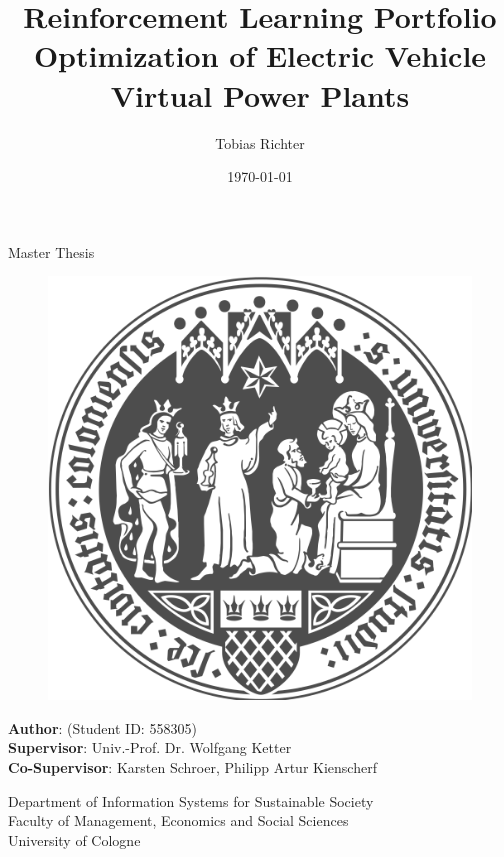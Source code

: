 \documentclass[a4paper, twoside, 12pt]{article}
\author{Tobias Richter}
\date{\today}
\title{Reinforcement Learning Portfolio Optimization of Electric Vehicle Virtual Power Plants}
\newcommand{\studentID}{558305}
\newcommand{\thesistype}{Master Thesis}
\newcommand{\supervisor}{Univ.-Prof. Dr. Wolfgang Ketter}
\newcommand{\cosupervisor}{Karsten Schroer, Philipp Artur Kienscherf}
\begin{document}
\makeatletter
\begin{titlepage}
    \begin{center}
        \vspace*{1cm}

        \Large
        \textbf{\@title{}}

        \vspace{1.5cm}

        \thesistype{}

        \vspace{1cm}

        \begin{figure}[htbp]
             \centering
             \includegraphics[width=.5\linewidth]{./fig/UoC_Logo.png}
        \end{figure}

        \vspace{1cm}

        \large
        \textbf{Author}: \@author{} (Student ID: \studentID{})\\
        \large
        \textbf{Supervisor}: \supervisor{}\\
        \large
        \textbf{Co-Supervisor}: \cosupervisor{}

        \vspace{1cm}
        \large
        Department of Information Systems for Sustainable Society\\
        Faculty of Management, Economics and Social Sciences\\
        University of Cologne\\

        \vspace{1cm}
        \@date{}

    \end{center}
\end{titlepage}
\makeatother
\clearpage
\thispagestyle{empty}
\end{document}
